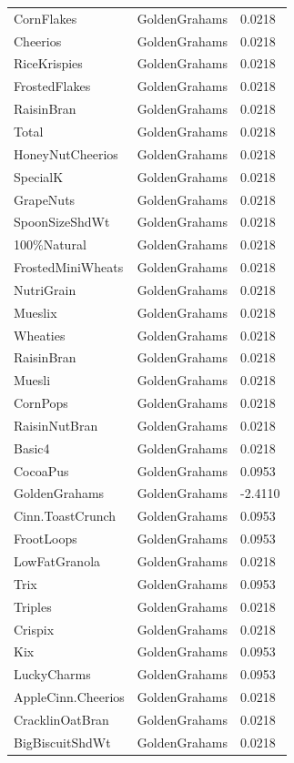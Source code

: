 \begin{table}[!htbp]
\begin{tabular}{lll}
CornFlakes & GoldenGrahams & 0.0218
\\
Cheerios & GoldenGrahams & 0.0218
\\
RiceKrispies & GoldenGrahams & 0.0218
\\
FrostedFlakes & GoldenGrahams & 0.0218
\\
RaisinBran & GoldenGrahams & 0.0218
\\
Total & GoldenGrahams & 0.0218
\\
HoneyNutCheerios & GoldenGrahams & 0.0218
\\
SpecialK & GoldenGrahams & 0.0218
\\
GrapeNuts & GoldenGrahams & 0.0218
\\
SpoonSizeShdWt & GoldenGrahams & 0.0218
\\
100\%Natural & GoldenGrahams & 0.0218
\\
FrostedMiniWheats & GoldenGrahams & 0.0218
\\
NutriGrain & GoldenGrahams & 0.0218
\\
Mueslix & GoldenGrahams & 0.0218
\\
Wheaties & GoldenGrahams & 0.0218
\\
RaisinBran & GoldenGrahams & 0.0218
\\
Muesli & GoldenGrahams & 0.0218
\\
CornPops & GoldenGrahams & 0.0218
\\
RaisinNutBran & GoldenGrahams & 0.0218
\\
Basic4 & GoldenGrahams & 0.0218
\\
CocoaPus & GoldenGrahams & 0.0953
\\
GoldenGrahams & GoldenGrahams & -2.4110
\\
Cinn.ToastCrunch & GoldenGrahams & 0.0953
\\
FrootLoops & GoldenGrahams & 0.0953
\\
LowFatGranola & GoldenGrahams & 0.0218
\\
Trix & GoldenGrahams & 0.0953
\\
Triples & GoldenGrahams & 0.0218
\\
Crispix & GoldenGrahams & 0.0218
\\
Kix & GoldenGrahams & 0.0953
\\
LuckyCharms & GoldenGrahams & 0.0953
\\
AppleCinn.Cheerios & GoldenGrahams & 0.0218
\\
CracklinOatBran & GoldenGrahams & 0.0218
\\
BigBiscuitShdWt & GoldenGrahams & 0.0218
\\

\end{tabular}
\end{table}
